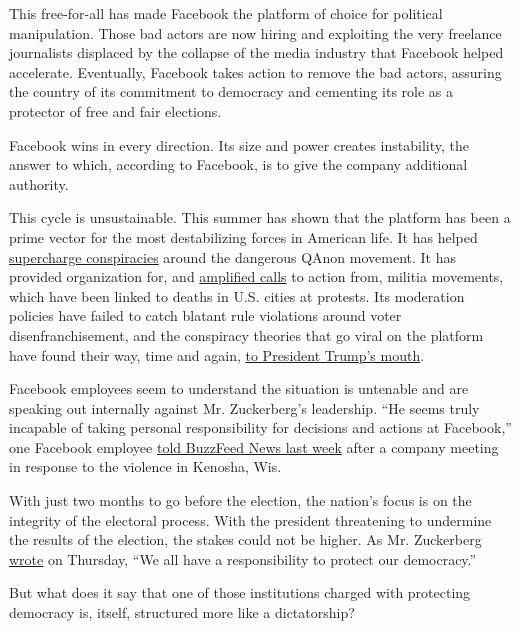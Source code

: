 This free-for-all has made Facebook the platform of choice for political
manipulation. Those bad actors are now hiring and exploiting the very
freelance journalists displaced by the collapse of the media industry
that Facebook helped accelerate. Eventually, Facebook takes action to
remove the bad actors, assuring the country of its commitment to
democracy and cementing its role as a protector of free and fair
elections.

Facebook wins in every direction. Its size and power creates
instability, the answer to which, according to Facebook, is to give the
company additional authority.

This cycle is unsustainable. This summer has shown that the platform has
been a prime vector for the most destabilizing forces in American life.
It has helped
\href{https://www.nytimes3xbfgragh.onion/2020/08/15/opinion/qanon-marjorie-greene-congress.html}{supercharge
conspiracies} around the dangerous QAnon movement. It has provided
organization for, and
\href{https://www.theverge.com/2020/8/26/21403004/facebook-kenosha-militia-groups-shooting-blm-protest}{amplified
calls} to action from, militia movements, which have been linked to
deaths in U.S. cities at protests. Its moderation policies have failed
to catch blatant rule violations around voter disenfranchisement, and
the conspiracy theories that go viral on the platform have found their
way, time and again,
\href{https://www.nbcnews.com/politics/politics-news/trump-s-plane-loaded-thugs-rumor-matches-months-old-facebook-n1238962}{to
President Trump's mouth}.

Facebook employees seem to understand the situation is untenable and are
speaking out internally against Mr. Zuckerberg's leadership. ``He seems
truly incapable of taking personal responsibility for decisions and
actions at Facebook,'' one Facebook employee
\href{https://www.buzzfeednews.com/article/ryanmac/facebook-employees-slam-zuckerberg-kenosha-militia-shooting}{told
BuzzFeed News last week} after a company meeting in response to the
violence in Kenosha, Wis.

With just two months to go before the election, the nation's focus is on
the integrity of the electoral process. With the president threatening
to undermine the results of the election, the stakes could not be
higher. As Mr. Zuckerberg
\href{https://about.fb.com/news/2020/09/additional-steps-to-protect-the-us-elections/}{wrote}
on Thursday, ``We all have a responsibility to protect our democracy.''

But what does it say that one of those institutions charged with
protecting democracy is, itself, structured more like a dictatorship?

